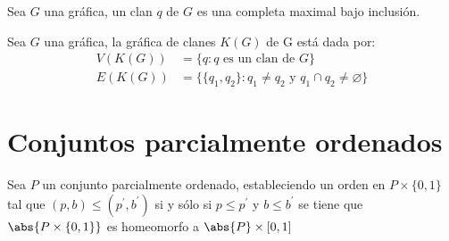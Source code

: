 \begin{Defi}[Clan]
Sea $G$ una gráfica, un clan $q$ de $G$ es una completa maximal bajo inclusión.
\end{Defi}

\begin{Defi}
Sea $G$ una gráfica, la gráfica de clanes $K(G)$ de G está dada por:
\begin{align*}
V(K(G))&=\{q: q \text{ es un clan de } G\} \\
E(K(G))&=\{\{q_1,q_2\}: q_1\neq q_2 \text{ y } q_1\cap q_2 \neq \varnothing \}
\end{align*}
\end{Defi}

\section{Conjuntos parcialmente ordenados}
\begin{Teo}
Sea $P$ un conjunto parcialmente ordenado, estableciendo un orden en $P\times\{0,1\}$ tal que $(p,b)\leq (p^{'},b^{'})$ si y sólo si $p\leq p^{'}$ y $b\leq b^{'}$ se tiene que $\abs{P\times\{0,1\}}$ es homeomorfo a $\abs{P}\times[0,1]$
\end{Teo} 

